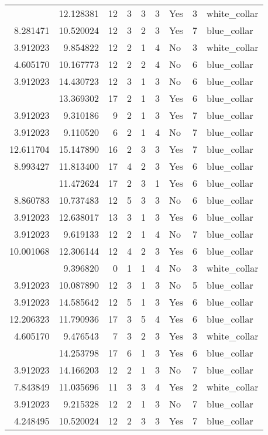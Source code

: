 \documentclass[
]{article}
\begin{document}
\begin{longtable}[t]{rrrrrllrl}
\addlinespace
9.110520 & 12.128381 & 12 & 3 & 3 & 3 & Yes & 3 & white\_collar\\
8.281471 & 10.520024 & 12 & 3 & 2 & 3 & Yes & 7 & blue\_collar\\
3.912023 & 9.854822 & 12 & 2 & 1 & 4 & No & 3 & white\_collar\\
4.605170 & 10.167773 & 12 & 2 & 2 & 4 & No & 6 & blue\_collar\\
3.912023 & 14.430723 & 12 & 3 & 1 & 3 & No & 6 & blue\_collar\\
\addlinespace
3.912023 & 13.369302 & 17 & 2 & 1 & 3 & Yes & 6 & blue\_collar\\
3.912023 & 9.310186 & 9 & 2 & 1 & 3 & Yes & 7 & blue\_collar\\
3.912023 & 9.110520 & 6 & 2 & 1 & 4 & No & 7 & blue\_collar\\
12.611704 & 15.147890 & 16 & 2 & 3 & 3 & Yes & 7 & blue\_collar\\
8.993427 & 11.813400 & 17 & 4 & 2 & 3 & Yes & 6 & blue\_collar\\
\addlinespace
7.130899 & 11.472624 & 17 & 2 & 3 & 1 & Yes & 6 & blue\_collar\\
8.860783 & 10.737483 & 12 & 5 & 3 & 3 & No & 6 & blue\_collar\\
3.912023 & 12.638017 & 13 & 3 & 1 & 3 & Yes & 6 & blue\_collar\\
3.912023 & 9.619133 & 12 & 2 & 1 & 4 & No & 7 & blue\_collar\\
10.001068 & 12.306144 & 12 & 4 & 2 & 3 & Yes & 6 & blue\_collar\\
\addlinespace
3.912023 & 9.396820 & 0 & 1 & 1 & 4 & No & 3 & white\_collar\\
3.912023 & 10.087890 & 12 & 3 & 1 & 3 & No & 5 & blue\_collar\\
3.912023 & 14.585642 & 12 & 5 & 1 & 3 & Yes & 6 & blue\_collar\\
12.206323 & 11.790936 & 17 & 3 & 5 & 4 & Yes & 6 & blue\_collar\\
4.605170 & 9.476543 & 7 & 3 & 2 & 3 & Yes & 3 & white\_collar\\
\addlinespace
3.912023 & 14.253798 & 17 & 6 & 1 & 3 & Yes & 6 & blue\_collar\\
3.912023 & 14.166203 & 12 & 2 & 1 & 3 & No & 7 & blue\_collar\\
7.843849 & 11.035696 & 11 & 3 & 3 & 4 & Yes & 2 & white\_collar\\
3.912023 & 9.215328 & 12 & 2 & 1 & 3 & No & 7 & blue\_collar\\
4.248495 & 10.520024 & 12 & 2 & 3 & 3 & Yes & 7 & blue\_collar\\

\end{longtable}
\end{document}

